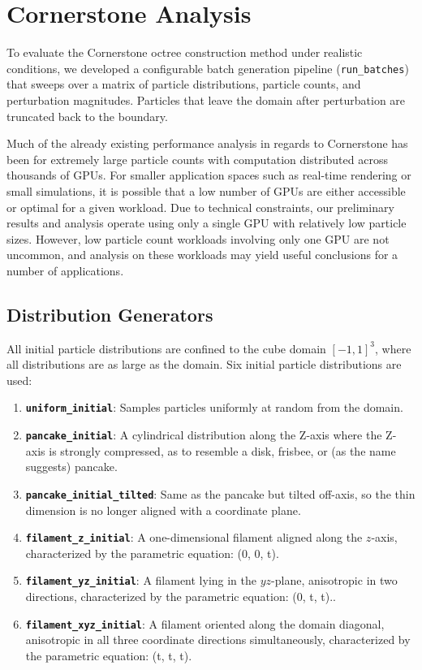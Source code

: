\section{Cornerstone Analysis}
\label{sec:analysis}

To evaluate the Cornerstone octree construction method under realistic conditions, we developed a configurable batch generation pipeline (\texttt{run\_batches}) that sweeps over a matrix of particle distributions, particle counts, and perturbation magnitudes. Particles that leave the domain after perturbation are truncated back to the boundary. 

Much of the already existing performance analysis in regards to Cornerstone has been for extremely large particle counts with computation distributed across thousands of GPUs. For smaller application spaces such as real-time rendering or small simulations, it is possible that a low number of GPUs are either accessible or optimal for a given workload. Due to technical constraints, our preliminary results and analysis operate using only a single GPU with relatively low particle sizes. However, low particle count workloads involving only one GPU are not uncommon, and analysis on these workloads may yield useful conclusions for a number of applications.

\subsection{Distribution Generators}
All initial particle distributions are confined to the cube domain $[-1,1]^3$, where all distributions are as large as the domain.
Six initial particle distributions are used:

\begin{enumerate}
    \item \textbf{\texttt{uniform\_initial}}: Samples particles uniformly at random from the domain.
    \item \textbf{\texttt{pancake\_initial}}: A cylindrical distribution along the Z-axis where the Z-axis is strongly compressed, as to resemble a disk, frisbee, or (as the name suggests) pancake.
    \item \textbf{\texttt{pancake\_initial\_tilted}}: Same as the pancake but tilted off-axis, so the thin dimension is no longer aligned with a coordinate plane.
    \item \textbf{\texttt{filament\_z\_initial}}: A one-dimensional filament aligned along the $z$-axis, characterized by the parametric equation: (0, 0, t).
    \item \textbf{\texttt{filament\_yz\_initial}}: A filament lying in the $yz$-plane, anisotropic in two directions, characterized by the parametric equation: (0, t, t)..
    \item \textbf{\texttt{filament\_xyz\_initial}}: A filament oriented along the domain diagonal, anisotropic in all three coordinate directions simultaneously, characterized by the parametric equation: (t, t, t).
\end{enumerate}

